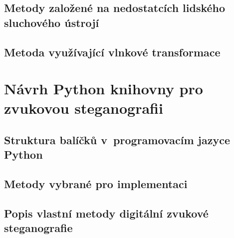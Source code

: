 \section{Metody založené na nedostatcích lidského sluchového ústrojí}
\label{sec:has}


\blindtext

\blindtext

\blindtext

\section{Metoda využívající vlnkové transformace}
\label{sec:wavelet-transform}


\blindtext


\chapter{Návrh Python knihovny pro zvukovou steganografii}
\label{cha:library-design}


\blindtext

\section{Struktura balíčků v~programovacím jazyce Python}
\label{sec:python-package-structure}


\blindtext

\blindtext

\section{Metody vybrané pro implementaci}
\label{sec:chosen-methods}


\blindtext

\blindtext

\section{Popis vlastní metody digitální zvukové steganografie}
\label{sec:own-method}


